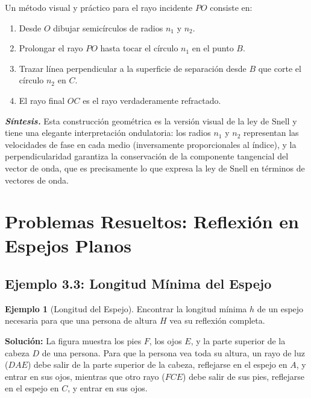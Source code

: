 \documentclass[12pt, a4paper]{article}
\theoremstyle{definition}
\newtheorem{ejemplo}{Ejemplo}[section]
\begin{document}
Un método visual y práctico para el rayo incidente \(PO\) consiste en:

\begin{enumerate}
  \item Desde \(O\) dibujar semicírculos de radios \(n_1\) y \(n_2\).
  \item Prolongar el rayo \(PO\) hasta tocar el círculo \(n_1\) en el punto \(B\).
  \item Trazar línea perpendicular a la superficie de separación desde \(B\) que corte el
        círculo \(n_2\) en \(C\).
  \item El rayo final \(OC\) es el rayo verdaderamente refractado.
\end{enumerate}

\textit{\textbf{Síntesis.}} Esta construcción geométrica es la versión visual de la ley de
Snell y tiene una elegante interpretación ondulatoria: los radios \(n_1\) y \(n_2\) representan
las velocidades de fase en cada medio (inversamente proporcionales al índice), y la
perpendicularidad garantiza la conservación de la componente tangencial del vector de onda,
que es precisamente lo que expresa la ley de Snell en términos de vectores de onda.

\section{Problemas Resueltos: Reflexión en Espejos Planos}
\label{sec:espejos}

\subsection{Ejemplo 3.3: Longitud Mínima del Espejo}
\label{sec:longitud_espejo}

\begin{ejemplo}[Longitud del Espejo]
Encontrar la longitud mínima \(h\) de un espejo necesaria para que una persona de altura \(H\)
vea su reflexión completa.
\end{ejemplo}

\textbf{Solución:} La figura muestra los pies \(F\), los ojos \(E\), y la parte superior de la
cabeza \(D\) de una persona. Para que la persona vea toda su altura, un rayo de luz (\(DAE\))
debe salir de la parte superior de la cabeza, reflejarse en el espejo en \(A\), y entrar en sus
ojos, mientras que otro rayo (\(FCE\)) debe salir de sus pies, reflejarse en el espejo en
\(C\), y entrar en sus ojos.
\end{document}
